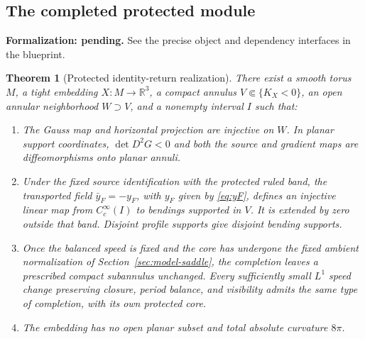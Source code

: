 \documentclass[11pt]{amsart}
\newtheorem{theorem}{Theorem}[section]
\theoremstyle{definition}
\theoremstyle{remark}
\newcommand{\R}{\mathbb R}\newcommand{\Sph}{\mathbb S}
\numberwithin{equation}{section}
\begin{document}
\subsection{The completed protected module}\label{sec:realization}
\par\noindent\textbf{Formalization: pending.} See the precise object and dependency interfaces in the blueprint.\par
\begin{theorem}[Protected identity-return realization]\label{thm:protected-realization}
There exist a smooth torus $M$, a tight embedding $X:M\to\R^3$, a
compact annulus $V\Subset\{K_X<0\}$, an open annular neighborhood
$W\supset V$, and a nonempty interval $I$ such that:
\begin{enumerate}[label=\textup{(\roman*)}]
\item The Gauss map and horizontal projection are injective on $W$.
In planar support coordinates, $\det D^2G<0$ and both the source and
gradient maps are diffeomorphisms onto planar annuli.
\item Under the fixed source identification with the protected ruled
band, the transported field $\bar y_F=-y_F$, with $y_F$ given by
\eqref{eq:yF}, defines an injective linear map from $C_c^\infty(I)$
to bendings supported in $V$. It is extended by zero outside that band.
Disjoint profile supports give disjoint bending supports.
\item Once the balanced speed is fixed and the core has undergone the
fixed ambient normalization of Section~\ref{sec:model-saddle}, the
completion leaves a prescribed compact subannulus unchanged. Every sufficiently small $L^1$
speed change preserving closure, period balance, and visibility admits
the same type of completion, with its own protected core.
\item The embedding has no open planar subset and total absolute curvature
$8\pi$.
\end{enumerate}
\end{theorem}
\end{document}
